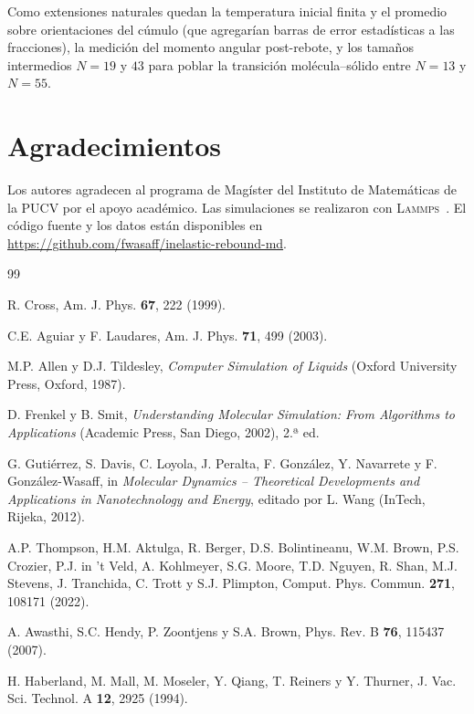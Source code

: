 \documentclass[10pt,a4paper,twocolumn]{article}
\newcommand{\lammps}{\textsc{Lammps}}
\begin{document}
Como extensiones naturales quedan la temperatura inicial finita y el
promedio sobre orientaciones del cúmulo (que agregarían barras de error
estadísticas a las fracciones), la medición del momento angular
post-rebote, y los tamaños intermedios $N=19$ y $43$ para poblar la
transición molécula--sólido entre $N=13$ y $N=55$.

\section*{Agradecimientos}

Los autores agradecen al programa de Magíster del Instituto de Matemáticas
de la PUCV por el apoyo académico. Las simulaciones se realizaron con
\lammps{}~\cite{Thompson2022}. El código fuente y los datos están
disponibles en \url{https://github.com/fwasaff/inelastic-rebound-md}.

\begin{thebibliography}{99}

R. Cross, Am. J. Phys. \textbf{67}, 222 (1999).

C.E. Aguiar y F. Laudares, Am. J. Phys. \textbf{71}, 499 (2003).

M.P. Allen y D.J. Tildesley, \textit{Computer Simulation of Liquids}
(Oxford University Press, Oxford, 1987).

D. Frenkel y B. Smit, \textit{Understanding Molecular Simulation: From
Algorithms to Applications} (Academic Press, San Diego, 2002), 2.ª ed.

G. Gutiérrez, S. Davis, C. Loyola, J. Peralta, F. González, Y. Navarrete
y F. González-Wasaff, in \textit{Molecular Dynamics -- Theoretical
Developments and Applications in Nanotechnology and Energy}, editado por
L. Wang (InTech, Rijeka, 2012).

A.P. Thompson, H.M. Aktulga, R. Berger, D.S. Bolintineanu, W.M. Brown,
P.S. Crozier, P.J. in 't Veld, A. Kohlmeyer, S.G. Moore, T.D. Nguyen,
R. Shan, M.J. Stevens, J. Tranchida, C. Trott y S.J. Plimpton,
Comput. Phys. Commun. \textbf{271}, 108171 (2022).

A. Awasthi, S.C. Hendy, P. Zoontjens y S.A. Brown,
Phys. Rev. B \textbf{76}, 115437 (2007).

H. Haberland, M. Mall, M. Moseler, Y. Qiang, T. Reiners y Y. Thurner,
J. Vac. Sci. Technol. A \textbf{12}, 2925 (1994).

\end{thebibliography}
\end{document}
